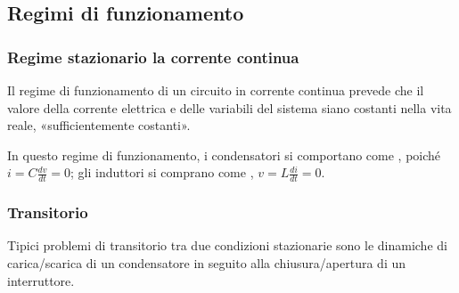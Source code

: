 \documentclass[letterpaper,10pt,italian]{jupyterBook}
\begin{document}
\subsection{Regimi di funzionamento}
\label{\detokenize{ch/electromagnetism/circuits-electric:regimi-di-funzionamento}}\label{\detokenize{ch/electromagnetism/circuits-electric:physics-hs-electromagnetism-circuits-electric-regimes}}

\subsubsection{Regime stazionario \sphinxhyphen{} la corrente continua}
\label{\detokenize{ch/electromagnetism/circuits-electric:regime-stazionario-la-corrente-continua}}\label{\detokenize{ch/electromagnetism/circuits-electric:physics-hs-electromagnetism-circuits-electric-regimes-dc}}
\sphinxAtStartPar
Il regime di funzionamento di un circuito in corrente continua prevede che il valore della corrente elettrica e delle variabili del sistema siano costanti \sphinxhyphen{} nella vita reale, «sufficientemente costanti».

\sphinxAtStartPar
In questo regime di funzionamento, i condensatori si comportano come {\hyperref[\detokenize{ch/electromagnetism/circuits-electric:physics-hs-electromagnetism-circuits-electric-circuits-open}]{}}, poiché \(i = C \frac{dv}{dt} = 0\); gli induttori si comprano come {\hyperref[\detokenize{ch/electromagnetism/circuits-electric:physics-hs-electromagnetism-circuits-electric-circuits-short}]{}}, \(v = L \frac{d i}{d t} = 0\).


\subsubsection{Transitorio}
\label{\detokenize{ch/electromagnetism/circuits-electric:transitorio}}\label{\detokenize{ch/electromagnetism/circuits-electric:physics-hs-electromagnetism-circuits-electric-regimes-dt}}
\sphinxAtStartPar
Tipici problemi di transitorio tra due condizioni stazionarie sono le dinamiche di carica/scarica di un condensatore in seguito alla chiusura/apertura di un interruttore.

\sphinxAtStartPar
{} 
\end{document}

